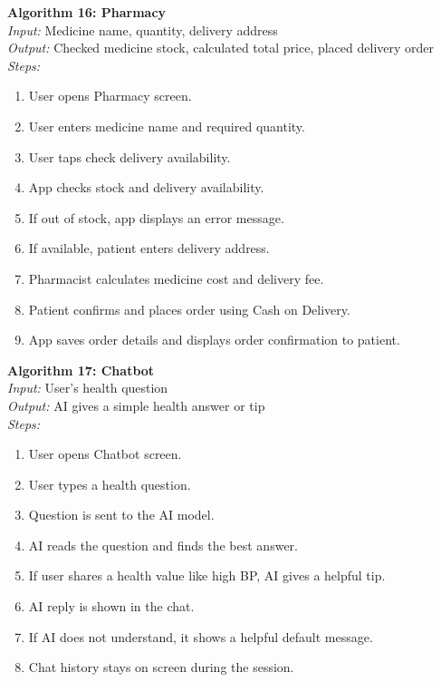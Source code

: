 \documentclass[12pt, a4paper, oneside]{report}
\begin{document}
\textbf{Algorithm 16: Pharmacy}\\
\textit{Input:} Medicine name, quantity, delivery address\\
\textit{Output:} Checked medicine stock, calculated total price, placed delivery order\\
\textit{Steps:}
\begin{enumerate}
    \item User opens Pharmacy screen.
    \item User enters medicine name and required quantity.
    \item User taps check delivery availability.
    \item App checks stock and delivery availability.
    \item If out of stock, app displays an error message.
    \item If available, patient enters delivery address.
    \item Pharmacist calculates medicine cost and delivery fee.
    \item Patient confirms and places order using Cash on Delivery.
    \item App saves order details and displays order confirmation to patient.
\end{enumerate}

\textbf{Algorithm 17: Chatbot}\\
\textit{Input:} User's health question\\
\textit{Output:} AI gives a simple health answer or tip\\
\textit{Steps:}
\begin{enumerate}
    \item User opens Chatbot screen.
    \item User types a health question.
    \item Question is sent to the AI model.
    \item AI reads the question and finds the best answer.
    \item If user shares a health value like high BP, AI gives a helpful tip.
    \item AI reply is shown in the chat.
    \item If AI does not understand, it shows a helpful default message.
    \item Chat history stays on screen during the session.
\end{enumerate}
\end{document}
